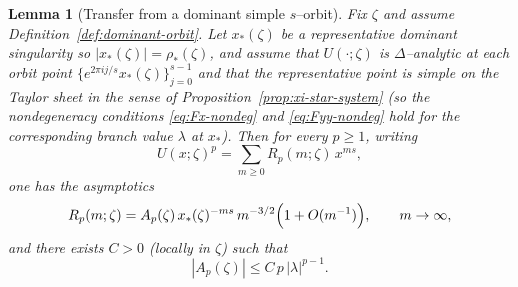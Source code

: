 \documentclass[11pt]{amsart}
\numberwithin{equation}{section}
\theoremstyle{plain}
\newtheorem{lemma}[theorem]{Lemma}
\theoremstyle{definition}
\theoremstyle{remark}
\begin{document}
\begin{lemma}[Transfer from a dominant simple $s$--orbit]\label{lem:coeff-asymp-dominant}
	Fix $\zeta$ and assume Definition~\ref{def:dominant-orbit}. Let $x_*(\zeta)$ be a representative
	dominant singularity so $|x_*(\zeta)|=\rho_*(\zeta)$, and assume that $U(\cdot;\zeta)$ is
	$\Delta$--analytic at each orbit point $\{e^{2\pi i j/s}x_*(\zeta)\}_{j=0}^{s-1}$ and that the
	representative point is \emph{simple} on the Taylor sheet in the sense of Proposition~\ref{prop:xi-star-system} (so the nondegeneracy conditions \eqref{eq:Fx-nondeg} and \eqref{eq:Fyy-nondeg} hold for the corresponding branch value $\lambda$ at $x_*$).
	Then for every $p\ge1$, writing
	\[
		U(x;\zeta)^p=\sum_{m\ge0} R_p(m;\zeta)\,x^{ms},
	\]
	one has the asymptotics
	\begin{equation}\label{eq:Rp-asymp}
		R_p(m;\zeta)=A_p(\zeta)\,x_*(\zeta)^{-ms}\,m^{-3/2}\Bigl(1+O(m^{-1})\Bigr),
		\qquad m\to\infty,
	\end{equation}
	and there exists $C>0$ (locally in $\zeta$) such that
	\[
		|A_p(\zeta)|\le C\,p\,|\lambda|^{p-1}.
	\]
\end{lemma}
\end{document}
